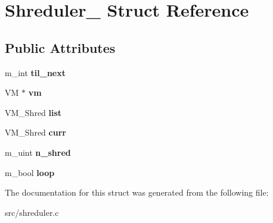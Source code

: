\hypertarget{structShreduler__}{}\section{Shreduler\+\_\+ Struct Reference}
\label{structShreduler__}
\subsection*{Public Attributes}
\begin{DoxyCompactItemize}
\item 
\hypertarget{structShreduler___aeac5cb5c5e5eee756b02102e0eb92b7c}{}\label{structShreduler___aeac5cb5c5e5eee756b02102e0eb92b7c} 
m\+\_\+int {\bfseries til\+\_\+next}
\item 
\hypertarget{structShreduler___a229320bc4f3679772cbea35f498f2c85}{}\label{structShreduler___a229320bc4f3679772cbea35f498f2c85} 
VM $\ast$ {\bfseries vm}
\item 
\hypertarget{structShreduler___ac8a85fcddcbb591921de4a6ed1ed7aba}{}\label{structShreduler___ac8a85fcddcbb591921de4a6ed1ed7aba} 
V\+M\+\_\+\+Shred {\bfseries list}
\item 
\hypertarget{structShreduler___a7031eb760dd0685e6b45e1e0ef49e6a8}{}\label{structShreduler___a7031eb760dd0685e6b45e1e0ef49e6a8} 
V\+M\+\_\+\+Shred {\bfseries curr}
\item 
\hypertarget{structShreduler___aa4dd38344bd1183127d731c5a52f7342}{}\label{structShreduler___aa4dd38344bd1183127d731c5a52f7342} 
m\+\_\+uint {\bfseries n\+\_\+shred}
\item 
\hypertarget{structShreduler___a45e739e1a2951684c9a410534389a1d9}{}\label{structShreduler___a45e739e1a2951684c9a410534389a1d9} 
m\+\_\+bool {\bfseries loop}
\end{DoxyCompactItemize}


The documentation for this struct was generated from the following file\+:\begin{DoxyCompactItemize}
\item 
src/shreduler.\+c\end{DoxyCompactItemize}
